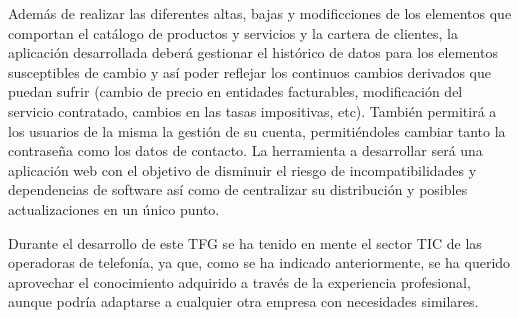 Además de realizar las diferentes altas, bajas y modificciones de los elementos que comportan el catálogo de productos y servicios y la cartera de clientes, la aplicación desarrollada deberá gestionar el histórico de datos para los elementos susceptibles de cambio y así poder reflejar los continuos cambios derivados que puedan sufrir (cambio de precio en entidades facturables, modificación del servicio contratado, cambios en las tasas impositivas, etc). También permitirá a los usuarios de la misma la gestión de su cuenta, permitiéndoles cambiar tanto la contraseña como los datos de contacto.
La herramienta a desarrollar será una aplicación web con el objetivo de disminuir el riesgo de incompatibilidades y dependencias de software así como de centralizar su distribución y posibles actualizaciones en un único punto.

Durante el desarrollo de este TFG se ha tenido en mente el sector TIC de las operadoras de telefonía, ya que, como se ha indicado anteriormente, se ha querido aprovechar el conocimiento adquirido a través de la experiencia profesional, aunque podría adaptarse a cualquier otra empresa con necesidades similares.

